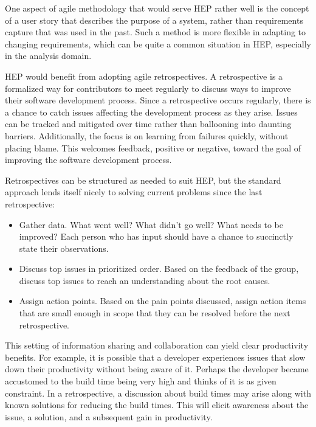 \documentclass[12pt,a4paper]{article}
\begin{document}
One aspect of agile methodology that would serve HEP rather well is the
concept of a user story that describes the purpose of a system, rather
than requirements capture that was used in the past. Such a method is
more flexible in adapting to changing requirements, which can be quite a
common situation in HEP, especially in the analysis domain.

HEP would benefit from adopting agile retrospectives. A retrospective is
a formalized way for contributors to meet regularly to discuss ways to
improve their software development process. Since a retrospective occurs
regularly, there is a chance to catch issues affecting the development
process as they arise. Issues can be tracked and mitigated over time
rather than ballooning into daunting barriers. Additionally, the focus
is on learning from failures quickly, without placing blame. This
welcomes feedback, positive or negative, toward the goal of improving
the software development process.

Retrospectives can be structured as needed to suit HEP, but the standard
approach lends itself nicely to solving current problems since the last
retrospective:

\begin{itemize}
\item
    Gather data. What went well? What didn't go well? What needs to be
  improved? Each person who has input should have a chance to succinctly
  state their observations.
  \item
    Discuss top issues in prioritized order. Based on the feedback of the
  group, discuss top issues to reach an understanding about the root
  causes.
  \item
    Assign action points. Based on the pain points discussed, assign
  action items that are small enough in scope that they can be resolved
  before the next retrospective.
  \end{itemize}

This setting of information sharing and collaboration can yield clear
productivity benefits. For example, it is possible that a developer
experiences issues that slow down their productivity without being aware
of it. Perhaps the developer became accustomed to the build time being
very high and thinks of it is as given constraint. In a retrospective, a
discussion about build times may arise along with known solutions for
reducing the build times. This will elicit awareness about the issue, a
solution, and a subsequent gain in productivity.
\end{document}
